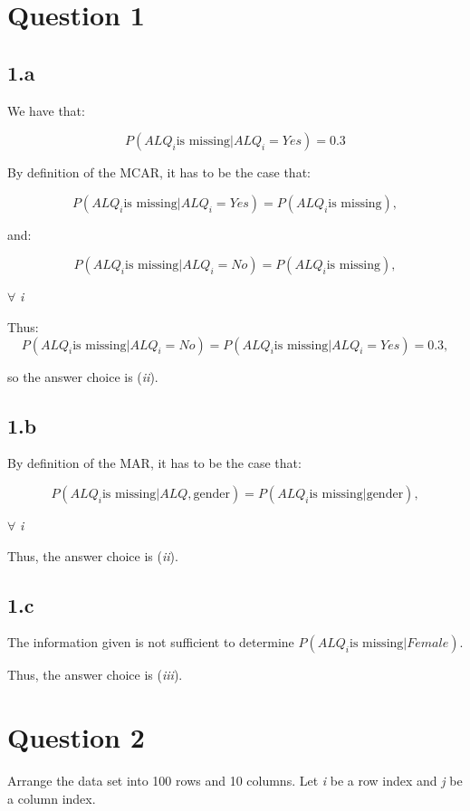 \documentclass{article}
\begin{document}
\section*{Question 1}

\subsection*{1.a}

We have that:

\[
P(ALQ_{i} \mbox{is missing}|ALQ_{i}=Yes)=0.3
\]

By definition of the MCAR, it has to be the case that:

\[
P(ALQ_{i} \mbox{is missing}|ALQ_{i}=Yes)=P(ALQ_{i} \mbox{is missing}),
\]

and:

\[
P(ALQ_{i} \mbox{is missing}|ALQ_{i}=No)=P(ALQ_{i} \mbox{is missing}),
\]

$\forall$ \textit{i}

Thus:
\[
P(ALQ_{i} \mbox{is missing}|ALQ_{i}=No)=P(ALQ_{i} \mbox{is missing}|ALQ_{i}=Yes)=0.3,
\]

so the answer choice is (\textit{ii}).

\subsection*{1.b}

By definition of the MAR, it has to be the case that:

\[
P(ALQ_{i} \mbox{is missing}|ALQ,\mbox{gender})=P(ALQ_{i} \mbox{is missing}|\mbox{gender}),
\]

$\forall$ \textit{i}

Thus, the answer choice is (\textit{ii}).

\subsection*{1.c}

The information given is not sufficient to determine $P(ALQ_{i} \mbox{is missing}|Female)$. 

Thus, the answer choice is (\textit{iii}).

\section*{Question 2}

Arrange the data set into 100 rows and 10 columns. Let \textit{i} be a row index and \textit{j} be a column index.
\end{document}
